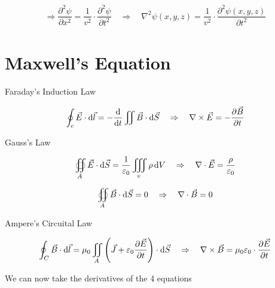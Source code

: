 \begin{equation*}
  \begin{aligned}
    \Rightarrow \dfrac{\partial^2 \psi}{\partial x^2} = \dfrac{1}{v^2} \cdot \dfrac{\partial^2 \psi}{\partial t^2}   
    \quad \Rightarrow \quad
    \nabla^2 \psi \left( x,y,z \right) = \dfrac{1}{v^2} \cdot \dfrac{\partial^2 \psi \left( x,y,z \right)}{\partial t^2}  
  \end{aligned}
\end{equation*}

\section{Maxwell's Equation}

Faraday's Induction Law

\begin{equation*}
  \oint_{c} \vec{E} \cdot \mathop{}\!\mathrm{d} \vec{l} = - \dfrac{\mathop{}\!\mathrm{d}}{\mathop{}\!\mathrm{d} t} \iint \vec{B} \cdot \mathop{}\!\mathrm{d} \vec{S}
  \quad \Rightarrow \quad
  \nabla \times \vec{E} = - \dfrac{\partial \vec{B}}{\partial t}    
\end{equation*}

Gauss's Law

\begin{equation*}
  \oiint_{A} \vec{E} \cdot \mathop{}\!\mathrm{d} \vec{S} = \dfrac{1}{\varepsilon_{0}} \iiint_{v} \rho \mathop{}\!\mathrm{d} V 
  \quad \Rightarrow \quad
  \nabla \cdot \vec{E} = \dfrac{\rho}{\varepsilon_0} 
\end{equation*}

\begin{equation*}
  \oiint_{A} \vec{B} \cdot \mathop{}\!\mathrm{d} \vec{S} = 0
  \quad \Rightarrow \quad
  \nabla \cdot \vec{B} = 0
\end{equation*}

Ampere's Circuital Law

\begin{equation*}
  \oint_{C} \vec{B} \cdot \mathop{}\!\mathrm{d} \vec{l} = \mu_{0} \iint_{A} \left( \vec{J} + \varepsilon_{0} \dfrac{\partial \vec{E}}{\partial t}  \right) \cdot \mathop{}\!\mathrm{d} \vec{S}
  \quad \Rightarrow \quad
  \nabla \times \vec{B} = \mu_0 \varepsilon_0 \cdot \dfrac{\partial \vec{E}}{\partial t} 
\end{equation*}

We can now take the derivatives of the 4 equations

